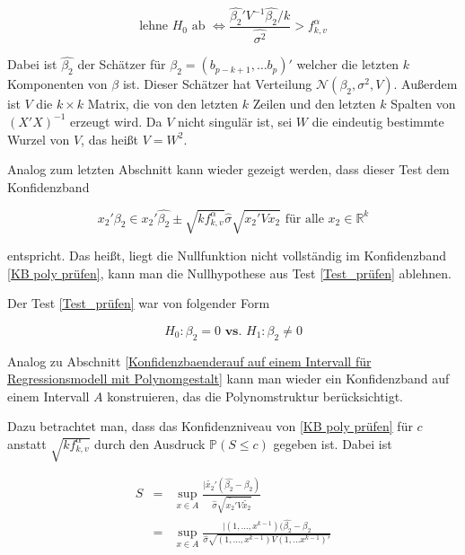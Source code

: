 \documentclass[12pt,a4paper]{article}
\theoremstyle{definition}
\theoremstyle{definition}
\theoremstyle{definition}
\theoremstyle{definition}
\begin{document}
\begin{equation}\label{KB hypo prüfen}
\text{lehne } H_0 \text{ ab } \Leftrightarrow \frac{\hat{\beta_2}' V^{-1} \hat{\beta_2}/k}{\widehat{\sigma^2} }> f^{\alpha}_{k,v}
\end{equation}

Dabei ist $\hat{\beta_2}$ der Schätzer für $\beta_2=(b_{p-k+1}, \ldots b_{p})'$ welcher die letzten $k$ Komponenten von $\beta$ ist. Dieser Schätzer hat Verteilung $\mathscr{N}(\beta_2,\sigma^2,V)$. Außerdem ist $V$ die $k \times k$ Matrix, die von den letzten $k$ Zeilen und den letzten $k$ Spalten von $(X'X)^{-1}$ erzeugt wird. Da $V$ nicht singulär ist, sei $W$ die eindeutig bestimmte Wurzel von $V$, das heißt $V=W^2$. 

Analog zum letzten Abschnitt kann wieder gezeigt werden, dass dieser Test dem Konfidenzband 

\begin{equation}\label{KB poly prüfen}
x_2' \beta_2 \in x_2' \hat{\beta_2} \pm \sqrt{k f^{\alpha}_{k,v}} \hat{\sigma} \sqrt{x_2' V x_2} \text{ für alle } x_2 \in \mathbb{R}^k
\end{equation}

entspricht. Das heißt, liegt die Nullfunktion nicht vollständig im Konfidenzband \eqref{KB poly prüfen}, kann man die Nullhypothese aus Test \eqref{Test_prüfen} ablehnen.

Der Test \eqref{Test_prüfen} war von folgender Form

\begin{equation*}
H_{0} : \beta_{2} = 0  \textbf{ vs. }  H_{1} : \beta_{2} \neq 0
\end{equation*}

Analog zu Abschnitt \ref{Konfidenzbaenderauf auf einem Intervall für Regressionsmodell mit Polynomgestalt} kann man wieder ein Konfidenzband auf einem Intervall $A$ konstruieren, das die Polynomstruktur berücksichtigt.

Dazu betrachtet man, dass das Konfidenzniveau von \eqref{KB poly prüfen} für $c$ anstatt $\sqrt{k f^{\alpha}_{k,v}}$ durch den Ausdruck $\mathbb{P}(S\leq c)$ gegeben ist. Dabei ist

\begin{eqnarray*}
S &=& \sup_{x \in A} \frac{\vert \tilde{x_2}' (\hat{\beta_2}-\beta_2)}{\hat{\sigma} \sqrt{\tilde{x_2'}V\tilde{x_2}}} \\
&=& \sup_{x \in A} \frac{\vert (1, \ldots, x^{k-1})(\hat{\beta_2}-\beta_2}{\hat{\sigma} \sqrt{(1, \ldots, x^{k-1}) V (1, \ldots x^{k-1})'}}
\end{eqnarray*}
\end{document}
